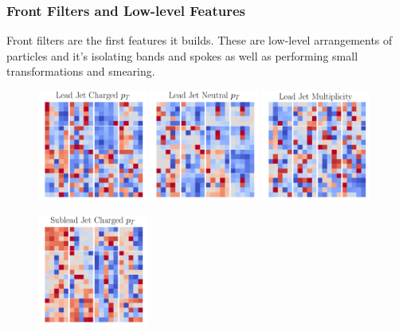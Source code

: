 \subsubsection{Front Filters and Low-level Features}
Front filters are the first features it builds. These are low-level arrangements of particles and it's isolating bands and spokes as well as performing small transformations and smearing. 
\begin{figure}[h!]
    \begin{center}
        \includegraphics[width=0.32\textwidth]{figures/event_selection/front_filters_channel_0.pdf}
        \includegraphics[width=0.32\textwidth]{figures/event_selection/front_filters_channel_1.pdf}
        \includegraphics[width=0.32\textwidth]{figures/event_selection/front_filters_channel_2.pdf}
    \end{center}
    \begin{center}
        \includegraphics[width=0.32\textwidth]{figures/event_selection/front_filters_channel_3.pdf}

\end{center}
\end{figure}
